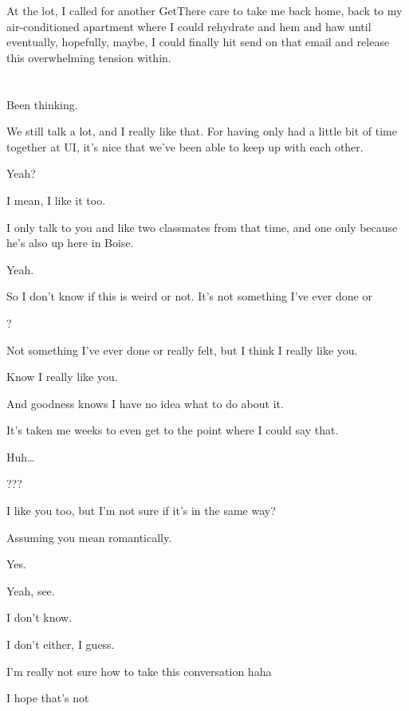 At the lot, I called for another GetThere care to take me back home, back to my air-conditioned apartment where I could rehydrate and hem and haw until eventually, hopefully, maybe, I could finally hit send on that email and release this overwhelming tension within.

\section{}

 Been thinking.

 We still talk a lot, and I really like that. For having only had a little bit of time together at UI, it's nice that we've been able to keep up with each other.

 Yeah?

 I mean, I like it too.

 I only talk to you and like two classmates from that time, and one only because he's also up here in Boise.

 Yeah.

 So I don't know if this is weird or not. It's not something I've ever done or

 ?

 Not something I've ever done or really felt, but I think I really like you.

 Know I really like you.

 And goodness knows I have no idea what to do about it.

 It's taken me weeks to even get to the point where I could say that.

 Huh\ldots{}

 ???

 I like you too, but I'm not sure if it's in the same way?

 Assuming you mean romantically.

 Yes.

 Yeah, see.

 I don't know.

 I don't either, I guess.

 I'm really not sure how to take this conversation haha

 I hope that's not

